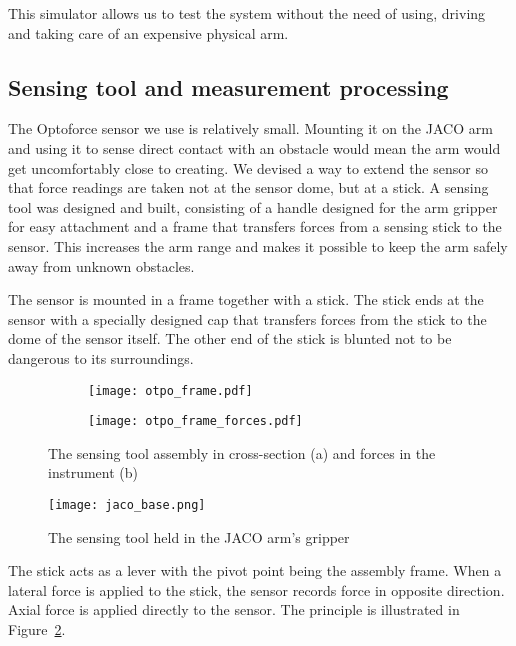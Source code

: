 \documentclass[buriama8_dp.tex]{subfiles}
\begin{document}
This simulator allows us to test the system without the need of using, driving and taking care of an expensive physical arm.


\subsection{Sensing tool and measurement processing}
\label{subsec:sense_tool}

The Optoforce sensor we use is relatively small. Mounting it on the JACO arm and using it to sense direct contact with an obstacle would mean the arm would get uncomfortably close to creating. We devised a way to extend the sensor so that force readings are taken not at the sensor dome, but at a stick. A sensing tool was designed and built, consisting of a handle designed for the arm gripper for easy attachment and a frame that transfers forces from a sensing stick to the sensor. This increases the arm range and makes it possible to keep the arm safely away from unknown obstacles.

The sensor is mounted in a frame together with a stick. The stick ends at the sensor with a specially designed cap that transfers forces from the stick to the dome of the sensor itself. The other end of the stick is blunted not to be dangerous to its surroundings.

\begin{figure}[htp]
  \centering

  \begin{subfigure}[t]{0.44\textwidth}
   \texttt{[image: otpo\_frame.pdf]}
   \caption{\label{fig:opto_frame}}
  \end{subfigure}
  \begin{subfigure}[t]{0.44\textwidth}
   \texttt{[image: otpo\_frame\_forces.pdf]}
   \caption{\label{fig:frame_forces}}
  \end{subfigure}

 \caption[Sensing tool]{The sensing tool assembly in cross-section (a) and forces in the instrument (b)}
 \label{fig:opto_frame_fig}
\end{figure}


\begin{figure}[htp]
  \centering
  \hspace{2cm}\texttt{[image: jaco\_base.png]}
  \caption[Sensing tool]{The sensing tool held in the JACO arm's gripper}
  \label{fig:tool_photo} 
\end{figure}

The stick acts as a lever with the pivot point being the assembly frame. When a lateral force is applied to the stick, the sensor records force in opposite direction. Axial force is applied directly to the sensor. The principle is illustrated in Figure~\ref{fig:frame_forces}.
\end{document}
